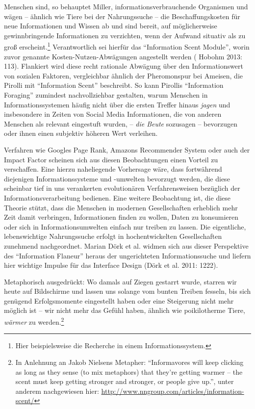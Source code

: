 \documentclass[a4paper,
fontsize=11pt,
oneside,
numbers=noperiodatend,
parskip=half-,
bibliography=totoc,
final
]{scrartcl}
\begin{document}
Menschen sind, so behauptet Miller, informationsverbrauchende Organismen
und wägen -- ähnlich wie Tiere bei der Nahrungssuche -- die
Beschaffungskosten für neue Informationen und Wissen ab und sind bereit,
auf möglicherweise gewinnbringende Informationen zu verzichten, wenn der
Aufwand situativ als zu groß erscheint.\footnote{Hier beispielsweise die
  Recherche in einem Informationssystem.} Verantwortlich sei hierfür das
\enquote{Information Scent Module}, worin zuvor genannte
Kosten-Nutzen-Abwägungen angestellt werden ( Hobohm 2013: 113).
Flankiert wird diese recht rationale Abwägung über den Informationswert
von sozialen Faktoren, vergleichbar ähnlich der Pheromonspur bei
Ameisen, die Pirolli mit \enquote{Information Scent} beschreibt. So kann
Pirollis \enquote{Information Foraging} zumindest nachvollziehbar
gestalten, warum Menschen in Informationssystemen häufig nicht über die
ersten Treffer hinaus \emph{jagen} und insbesondere in Zeiten von Social
Media Informationen, die von anderen Menschen als relevant eingestuft
wurden, -- \emph{die Beute} sozusagen -- bevorzugen oder ihnen einen
subjektiv höheren Wert verleihen.

Verfahren wie Googles Page Rank, Amazons Recommender System oder auch
der Impact Factor scheinen sich aus diesen Beobachtungen einen Vorteil
zu verschaffen. Eine hierzu naheliegende Vorhersage wäre, dass
fortwährend diejenigen Informationssysteme und -umwelten bevorzugt
werden, die diese scheinbar tief in uns verankerten evolutionären
Verfahrensweisen bezüglich der Informationsverarbeitung bedienen. Eine
weitere Beobachtung ist, die diese Theorie stützt, dass die Menschen in
modernen Gesellschaften erheblich mehr Zeit damit verbringen,
Informationen finden zu wollen, Daten zu konsumieren oder sich in
Informationsumwelten einfach nur treiben zu lassen. Die eigentliche,
lebenswichtige Nahrungssuche erfolgt in hochentwickelten Gesellschaften
zunehmend nachgeordnet. Marian Dörk et al. widmen sich aus dieser
Perspektive des \enquote{Information Flaneur} heraus der ungerichteten
Informationssuche und liefern hier wichtige Impulse für das Interface
Design (Dörk et al. 2011: 1222).

Metaphorisch ausgedrückt: Wo damals auf Ziegen gestarrt wurde, starren
wir heute auf Bildschirme und lassen uns solange vom bunten Treiben
fesseln, bis sich genügend Erfolgsmomente eingestellt haben oder eine
Steigerung nicht mehr möglich ist -- wir nicht mehr das Gefühl haben,
ähnlich wie poikilotherme Tiere, \emph{wärmer} zu werden.\footnote{In
  Anlehnung an Jakob Nielsens Metapher: \enquote{Informavores will keep
  clicking as long as they sense (to mix metaphors) that they're getting
  warmer -- the scent must keep getting stronger and stronger, or people
  give up.}, unter anderem nachgewiesen hier:
  \url{http://www.nngroup.com/articles/information-scent/}}
\end{document}
